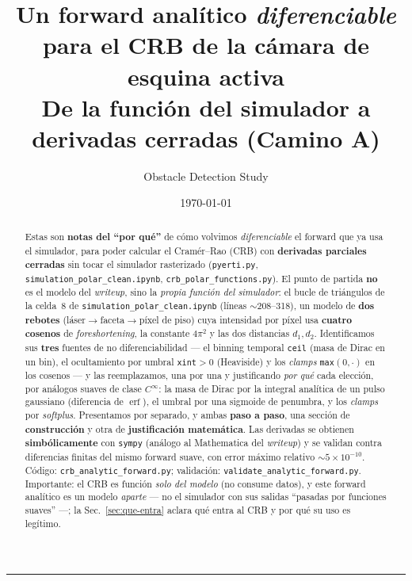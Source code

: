 \documentclass[11pt,a4paper]{article}
\title{Un forward anal\'itico \emph{diferenciable} para el CRB de la
c\'amara de esquina activa\\[4pt]
\large De la \textbf{funci\'on del simulador} a derivadas cerradas (Camino A)}
\author{Obstacle Detection Study}
\date{\today}
\theoremstyle{plain}
\theoremstyle{definition}
\newcommand{\erf}{\operatorname{erf}}
\begin{document}
\maketitle

\begin{abstract}
Estas son \textbf{notas del ``por qu\'e''} de c\'omo volvimos
\emph{diferenciable} el forward que ya usa el simulador, para poder calcular el
Cram\'er--Rao (CRB) con \textbf{derivadas parciales cerradas} sin tocar el
simulador rasterizado (\texttt{pyerti.py},
\texttt{simulation\_polar\_clean.ipynb}, \texttt{crb\_polar\_functions.py}).
El punto de partida \textbf{no} es el modelo del \emph{writeup}, sino la
\emph{propia funci\'on del simulador}: el bucle de tri\'angulos de la celda~8 de
\texttt{simulation\_polar\_clean.ipynb} (l\'ineas $\sim$208--318), un modelo de
\textbf{dos rebotes} (l\'aser$\to$faceta$\to$p\'ixel de piso) cuya intensidad por
p\'ixel usa \textbf{cuatro cosenos} de \emph{foreshortening}, la constante
$4\pi^2$ y las dos distancias $d_1,d_2$. Identificamos sus \textbf{tres} fuentes
de no diferenciabilidad --- el binning temporal \texttt{ceil} (masa de Dirac en
un bin), el ocultamiento por umbral \texttt{xint}$>0$ (Heaviside) y los
\emph{clamps} \texttt{max}$(0,\cdot)$ en los cosenos --- y las reemplazamos, una
por una y justificando \emph{por qu\'e} cada elecci\'on, por an\'alogos suaves de
clase $C^\infty$: la masa de Dirac por la integral anal\'itica de un pulso
gaussiano (diferencia de $\erf$), el umbral por una sigmoide de penumbra, y los
\emph{clamps} por \emph{softplus}. Presentamos por separado, y ambas
\textbf{paso a paso}, una secci\'on de \textbf{construcci\'on} y otra de
\textbf{justificaci\'on matem\'atica}. Las derivadas se obtienen
\textbf{simb\'olicamente} con \texttt{sympy} (an\'alogo al Mathematica del
\emph{writeup}) y se validan contra diferencias finitas del mismo forward suave,
con error m\'aximo relativo $\sim\!5\times10^{-10}$. C\'odigo:
\texttt{crb\_analytic\_forward.py}; validaci\'on:
\texttt{validate\_analytic\_forward.py}. Importante: el CRB es funci\'on
\emph{solo del modelo} (no consume datos), y este forward anal\'itico es un
modelo \emph{aparte} --- no el simulador con sus salidas ``pasadas por funciones
suaves'' ---; la Sec.~\ref{sec:que-entra} aclara qu\'e entra al CRB y por qu\'e su
uso es leg\'itimo.
\end{abstract}

\tableofcontents
\bigskip\hrule\bigskip

\end{document}
